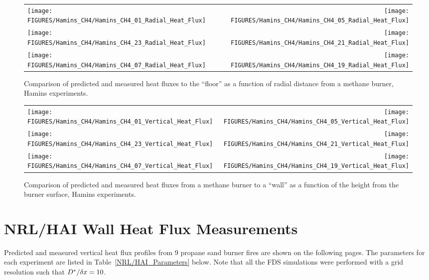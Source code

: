 \newpage

\begin{figure}[p]
\begin{tabular*}{\textwidth}{l@{\extracolsep{\fill}}r}
\texttt{[image: FIGURES/Hamins\_CH4/Hamins\_CH4\_01\_Radial\_Heat\_Flux]} &
\texttt{[image: FIGURES/Hamins\_CH4/Hamins\_CH4\_05\_Radial\_Heat\_Flux]} \\
\texttt{[image: FIGURES/Hamins\_CH4/Hamins\_CH4\_23\_Radial\_Heat\_Flux]} &
\texttt{[image: FIGURES/Hamins\_CH4/Hamins\_CH4\_21\_Radial\_Heat\_Flux]} \\
\texttt{[image: FIGURES/Hamins\_CH4/Hamins\_CH4\_07\_Radial\_Heat\_Flux]} &
\texttt{[image: FIGURES/Hamins\_CH4/Hamins\_CH4\_19\_Radial\_Heat\_Flux]}
\end{tabular*}
\label{Hamins_CH4_Radial}
\caption[Radial heat flux predictions, Hamins methane burner experiments.]
{Comparison of predicted and measured heat fluxes to the ``floor'' as a function of radial distance from a methane burner, Hamins experiments.}
\end{figure}

\begin{figure}[p]
\begin{tabular*}{\textwidth}{l@{\extracolsep{\fill}}r}
\texttt{[image: FIGURES/Hamins\_CH4/Hamins\_CH4\_01\_Vertical\_Heat\_Flux]} &
\texttt{[image: FIGURES/Hamins\_CH4/Hamins\_CH4\_05\_Vertical\_Heat\_Flux]} \\
\texttt{[image: FIGURES/Hamins\_CH4/Hamins\_CH4\_23\_Vertical\_Heat\_Flux]} &
\texttt{[image: FIGURES/Hamins\_CH4/Hamins\_CH4\_21\_Vertical\_Heat\_Flux]} \\
\texttt{[image: FIGURES/Hamins\_CH4/Hamins\_CH4\_07\_Vertical\_Heat\_Flux]} &
\texttt{[image: FIGURES/Hamins\_CH4/Hamins\_CH4\_19\_Vertical\_Heat\_Flux]}
\end{tabular*}
\label{Hamins_CH4_Vertical}
\caption[Vertical heat flux predictions, Hamins methane burner experiments.]
{Comparison of predicted and measured heat fluxes from a methane burner to a ``wall'' as a function of the height from the burner surface, Hamins experiments.}
\end{figure}

\clearpage


\section{NRL/HAI Wall Heat Flux Measurements}

Predicted and measured vertical heat flux profiles from 9 propane sand burner fires are shown on the following pages. The parameters for each
experiment are listed in Table~\ref{NRL/HAI_Parameters} below. Note that all the FDS simulations were performed with a grid resolution such that
$D^*/\delta x=10$.

